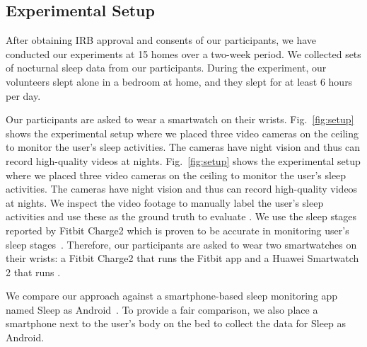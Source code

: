 \subsection{Experimental Setup}
After obtaining IRB approval and consents of our participants, we have conducted our experiments at 15 homes over a two-week period. We
collected  sets of nocturnal sleep data from our participants. During the experiment, our volunteers slept alone in a bedroom at
home, and they slept for at least 6 hours per day.


Our participants are asked to wear a smartwatch on their wrists. Fig.~\ref{fig:setup} shows the experimental setup where we placed three
video cameras on the ceiling to monitor the user's sleep activities. The cameras have night vision and thus can record high-quality videos
at nights.  Fig.~\ref{fig:setup} shows the experimental setup where we placed three video cameras on the ceiling to monitor the user's
sleep activities. The cameras have night vision and thus can record high-quality videos at nights. We inspect the video footage to manually
label the user's sleep activities and use these as the ground truth to evaluate \systemname. We use the sleep stages reported by Fitbit
Charge2 which is proven to be accurate in monitoring user's sleep stages~\cite{}. Therefore, our participants are asked to wear two
smartwatches on their wrists: a Fitbit Charge2 that runs the Fitbit app and a Huawei Smartwatch 2 that runs \systemname.

We compare our approach against a smartphone-based sleep monitoring app named Sleep as Android~\cite{SleepAndroid}. To provide a fair
comparison, we also place a smartphone next to the user's body on the bed to collect the data for Sleep as Android.
